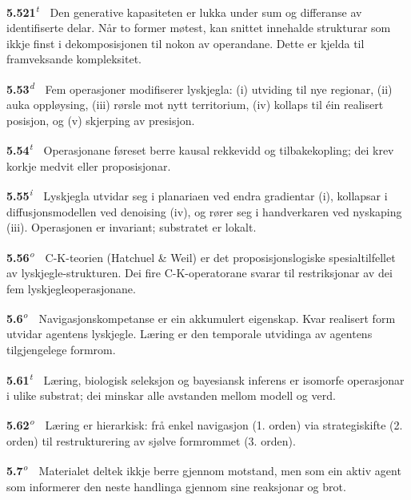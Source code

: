 \documentclass[10pt]{article}
\begin{document}
\noindent\textbf{5.521}\textsuperscript{\textit{t}}~~Den generative kapasiteten er lukka under sum og differanse av identifiserte delar. Når to former møtest, kan snittet innehalde strukturar som ikkje finst i dekomposisjonen til nokon av operandane. Dette er kjelda til framveksande kompleksitet.




\noindent\textbf{5.53}\textsuperscript{\textit{d}}~~Fem operasjoner modifiserer lyskjegla: (i) utviding til nye regionar, (ii) auka oppløysing, (iii) rørsle mot nytt territorium, (iv) kollaps til éin realisert posisjon, og (v) skjerping av presisjon.




\noindent\textbf{5.54}\textsuperscript{\textit{t}}~~Operasjonane føreset berre kausal rekkevidd og tilbakekopling; dei krev korkje medvit eller proposisjonar.




\noindent\textbf{5.55}\textsuperscript{\textit{i}}~~Lyskjegla utvidar seg i planariaen ved endra gradientar (i), kollapsar i diffusjonsmodellen ved denoising (iv), og rører seg i handverkaren ved nyskaping (iii). Operasjonen er invariant; substratet er lokalt.




\noindent\textbf{5.56}\textsuperscript{\textit{o}}~~C-K-teorien (Hatchuel \& Weil) er det proposisjonslogiske spesialtilfellet av lyskjegle-strukturen. Dei fire C-K-operatorane svarar til restriksjonar av dei fem lyskjegleoperasjonane.




\noindent\textbf{5.6}\textsuperscript{\textit{o}}~~Navigasjonskompetanse er ein akkumulert eigenskap. Kvar realisert form utvidar agentens lyskjegle. Læring er den temporale utvidinga av agentens tilgjengelege formrom.




\noindent\textbf{5.61}\textsuperscript{\textit{t}}~~Læring, biologisk seleksjon og bayesiansk inferens er isomorfe operasjonar i ulike substrat; dei minskar alle avstanden mellom modell og verd.




\noindent\textbf{5.62}\textsuperscript{\textit{o}}~~Læring er hierarkisk: frå enkel navigasjon (1. orden) via strategiskifte (2. orden) til restrukturering av sjølve formrommet (3. orden).




\noindent\textbf{5.7}\textsuperscript{\textit{o}}~~Materialet deltek ikkje berre gjennom motstand, men som ein aktiv agent som informerer den neste handlinga gjennom sine reaksjonar og brot.
\end{document}

